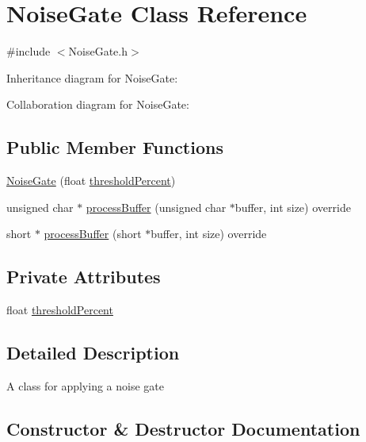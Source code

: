 \hypertarget{classNoiseGate}{}\section{Noise\+Gate Class Reference}
\label{classNoiseGate}


{\ttfamily \#include $<$Noise\+Gate.\+h$>$}



Inheritance diagram for Noise\+Gate\+:


Collaboration diagram for Noise\+Gate\+:
\subsection*{Public Member Functions}
\begin{DoxyCompactItemize}
\item 
\hyperlink{classNoiseGate_a2c9af941b7e82052f5c18d4f59267f65}{Noise\+Gate} (float \hyperlink{classNoiseGate_a625000d0a0548d52795a3df0f165f275}{threshold\+Percent})
\item 
unsigned char $\ast$ \hyperlink{classNoiseGate_a820117e917acd9cdc55e5f4ee46b9231}{process\+Buffer} (unsigned char $\ast$buffer, int size) override
\item 
short $\ast$ \hyperlink{classNoiseGate_a05c33d8853ee2764af12cce10ae0e59d}{process\+Buffer} (short $\ast$buffer, int size) override
\end{DoxyCompactItemize}
\subsection*{Private Attributes}
\begin{DoxyCompactItemize}
\item 
float \hyperlink{classNoiseGate_a625000d0a0548d52795a3df0f165f275}{threshold\+Percent}
\end{DoxyCompactItemize}


\subsection{Detailed Description}
A class for applying a noise gate 

\subsection{Constructor \& Destructor Documentation}
\mbox{\label{classNoiseGate_a2c9af941b7e82052f5c18d4f59267f65}} 
